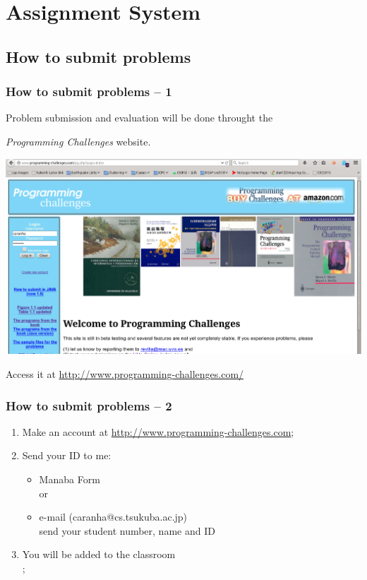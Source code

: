 \documentclass{beamer}
\begin{document}
\section{Assignment System}
\subsection{How to submit problems}
\begin{frame}
  \frametitle{How to submit problems -- 1}

  Problem submission and evaluation will be done throught the

  \medskip

  \emph{Programming Challenges} website.
  \begin{center}
    \includegraphics[height=0.4\textheight]{pcwebsite}
  \end{center}

  \medskip

  Access it at \url{http://www.programming-challenges.com/}
\end{frame}

\begin{frame}
  \frametitle{How to submit problems -- 2}
  \begin{enumerate}
      \item Make an account at \url{http://www.programming-challenges.com};\\ 
      \item Send your ID to me:
        \begin{itemize}
        \item Manaba Form\\
          or
        \item e-mail (caranha@cs.tsukuba.ac.jp)\\
          send your student number, name and ID
        \end{itemize}
      \item You will be added to the classroom\\
        ; 
  \end{enumerate}
\end{frame}
\end{document}
